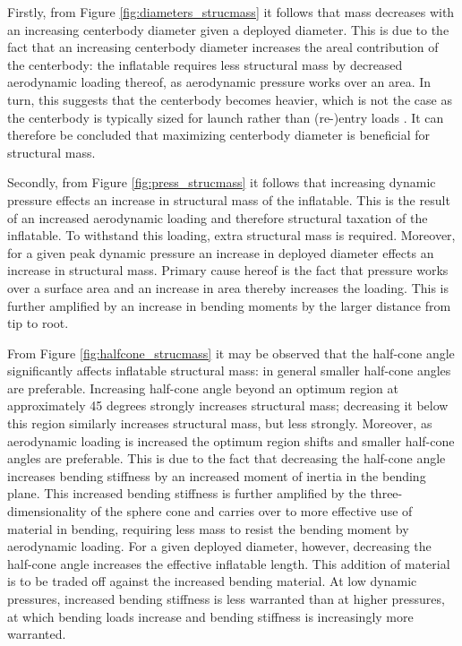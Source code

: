 Firstly, from Figure \ref{fig:diameters_strucmass} it follows that mass decreases with an increasing centerbody diameter given a deployed diameter. This is due to the fact that an increasing centerbody diameter increases the areal contribution of the centerbody: the inflatable requires less structural mass by decreased aerodynamic loading thereof, as aerodynamic pressure works over an area. In turn, this suggests that the centerbody becomes heavier, which is not the case as the centerbody is typically sized for launch rather than (re-)entry loads \cite{Lindell2006}. It can therefore be concluded that maximizing centerbody diameter is beneficial for structural mass. 

Secondly, from Figure \ref{fig:press_strucmass} it follows that increasing dynamic pressure effects an increase in structural mass of the inflatable. This is the result of an increased aerodynamic loading and therefore structural taxation of the inflatable. To withstand this loading, extra structural mass is required. Moreover, for a given peak dynamic pressure an increase in deployed diameter effects an increase in structural mass. Primary cause hereof is the fact that pressure works over a surface area and an increase in area thereby increases the loading. This is further amplified by an increase in bending moments by the larger distance from tip to root.

From Figure \ref{fig:halfcone_strucmass} it may be observed that the half-cone angle significantly affects inflatable structural mass: in general smaller half-cone angles are preferable. Increasing half-cone angle beyond an optimum region at approximately 45 degrees strongly increases structural mass; decreasing it below this region similarly increases structural mass, but less strongly. Moreover, as aerodynamic loading is increased the optimum region shifts and smaller half-cone angles are preferable. This is due to the fact that decreasing the half-cone angle increases bending stiffness by an increased moment of inertia in the bending plane. This increased bending stiffness is further amplified by the three-dimensionality of the sphere cone and carries over to more effective use of material in bending, requiring less mass to resist the bending moment by aerodynamic loading. For a given deployed diameter, however, decreasing the half-cone angle increases the effective inflatable length. This addition of material is to be traded off against the increased bending material. At low dynamic pressures, increased bending stiffness is less warranted than at higher pressures, at which bending loads increase and bending stiffness is increasingly more warranted.

